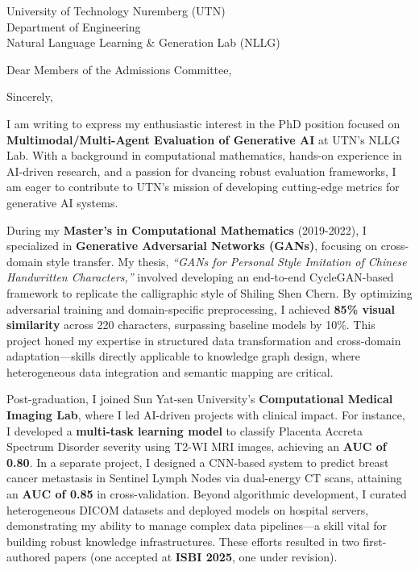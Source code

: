 \documentclass[11pt,a4paper, final]{moderncv}
\begin{document}
{University of Technology Nuremberg (UTN)\\
Department of Engineering\\
Natural Language Learning \& Generation Lab (NLLG)
}
\date{\today}
\opening{Dear Members of the Admissions Committee,}
\closing{Sincerely,}
\makelettertitle
\thispagestyle{empty}
\pagestyle{empty}
I am writing to express my enthusiastic interest in the PhD position focused on 
\textbf{Multimodal/Multi-Agent Evaluation of Generative AI} at UTN's NLLG Lab. 
With a background in computational mathematics, hands-on experience in AI-driven research, 
and a passion for dvancing robust evaluation frameworks, 
I am eager to contribute to UTN's mission of developing cutting-edge metrics for generative AI systems.

During my \textbf{Master's in Computational Mathematics} (2019-2022), 
I specialized in \textbf{Generative Adversarial Networks (GANs)}, 
focusing on cross-domain style transfer. 
My thesis, \emph{``GANs for Personal Style Imitation of Chinese Handwritten Characters,''} 
involved developing an end-to-end CycleGAN-based framework to replicate the calligraphic style of Shiling Shen Chern. 
By optimizing adversarial training and domain-specific preprocessing, 
I achieved \textbf{85\% visual similarity} across 220 characters, surpassing baseline models by 10\%. 
This project honed my expertise in structured data transformation and cross-domain adaptation—skills directly applicable to knowledge graph design, where heterogeneous data integration and semantic mapping are critical.

Post-graduation, I joined Sun Yat-sen University's \textbf{Computational Medical Imaging Lab}, 
where I led AI-driven projects with clinical impact. 
For instance, I developed a \textbf{multi-task learning model} to 
classify Placenta Accreta Spectrum Disorder severity using T2-WI MRI images, achieving an \textbf{AUC of 0.80}. 
In a separate project, 
I designed a CNN-based system to predict breast cancer metastasis in Sentinel Lymph Nodes via dual-energy CT scans, 
attaining an \textbf{AUC of 0.85} in cross-validation. 
Beyond algorithmic development, I curated heterogeneous DICOM datasets and deployed models on hospital servers, 
demonstrating my ability to manage complex data pipelines—a skill vital for building robust knowledge infrastructures. 
These efforts resulted in two first-authored papers (one accepted at \textbf{ISBI 2025}, one under revision).
\end{document}
